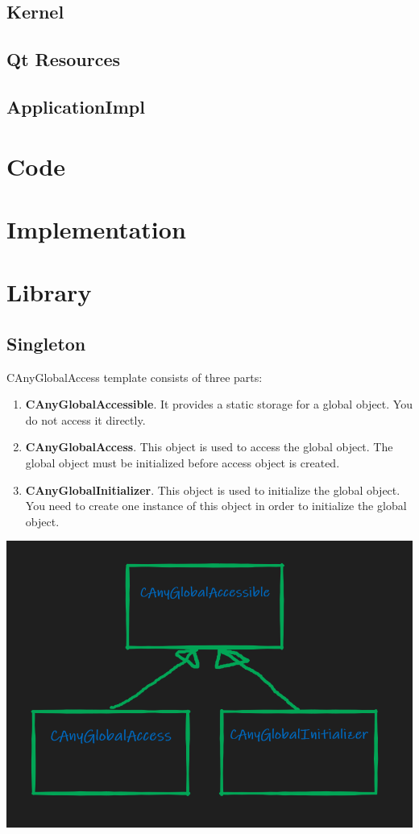 \documentclass{article}
\begin{document}
\subsection{Kernel}

\subsection{Qt Resources}

\subsection{ApplicationImpl}


\section{Code}

\section{Implementation}

\section{Library}
\subsection{Singleton}\label{section::Singleton}
CAnyGlobalAccess template consists of three parts:
\begin{enumerate}
\item \textbf{CAnyGlobalAccessible}. It provides a static storage for a global object. You do not access it directly.
\item \textbf{CAnyGlobalAccess}. This object is used to access the global object. The global object must be initialized before access object is created.
\item \textbf{CAnyGlobalInitializer}. This object is used to initialize the global object. You need to create one instance of this object in order to initialize the global object.
\end{enumerate}
\begin{center}
\includegraphics[scale = 0.3]{Figures/CAnyGlobalAccess.png}
\end{center}
\end{document}
